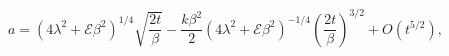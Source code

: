 \begin{equation}
a=(4\lambda^2+ \mathcal{E}\beta^2)^{1/4}\sqrt{\frac{2t}{\beta}}
-\frac{k\beta^2}{2} (4\lambda^2+ \mathcal{E}\beta^2)^{-1/4}
\left(\frac{2t}{\beta}\right)^{3/2} + O (t^{5/2}),
\end{equation}

